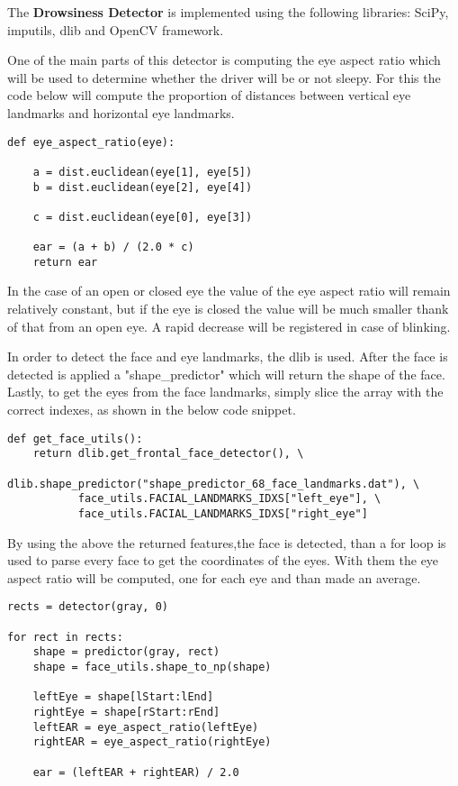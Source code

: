 The \textbf{Drowsiness Detector} is implemented using the following libraries: SciPy, imputils, dlib and OpenCV framework. \par

One of the main parts of this detector is computing the eye aspect ratio which will be used to determine whether the driver will be or not sleepy. For this the code below will compute the proportion of distances between vertical eye landmarks and horizontal eye landmarks.

\begin{lstlisting}
def eye_aspect_ratio(eye):

    a = dist.euclidean(eye[1], eye[5])
    b = dist.euclidean(eye[2], eye[4])

    c = dist.euclidean(eye[0], eye[3])

    ear = (a + b) / (2.0 * c)
    return ear
\end{lstlisting}

In the case of an open or closed eye the value of the eye aspect ratio will remain relatively constant, but if the eye is closed the value will be much smaller thank of that from an open eye. A rapid decrease will be registered in case of blinking. \par

In order to detect the face and eye landmarks, the dlib is used. After the face is detected is applied a "shape\_predictor" which will return the shape of the face. Lastly, to get the eyes from the face landmarks, simply slice the array with the correct indexes, as shown in the below code snippet. 

\begin{lstlisting}
def get_face_utils():
    return dlib.get_frontal_face_detector(), \
           dlib.shape_predictor("shape_predictor_68_face_landmarks.dat"), \
           face_utils.FACIAL_LANDMARKS_IDXS["left_eye"], \
           face_utils.FACIAL_LANDMARKS_IDXS["right_eye"]

\end{lstlisting}

By using the above the returned features,the face is detected, than a for loop is used to parse every face to get the coordinates of the eyes. With them the eye aspect ratio will be computed, one for each eye and than made an average. 

\begin{lstlisting}
rects = detector(gray, 0)

for rect in rects:
    shape = predictor(gray, rect)
    shape = face_utils.shape_to_np(shape)

    leftEye = shape[lStart:lEnd]
    rightEye = shape[rStart:rEnd]
    leftEAR = eye_aspect_ratio(leftEye)
    rightEAR = eye_aspect_ratio(rightEye)

    ear = (leftEAR + rightEAR) / 2.0
\end{lstlisting}


